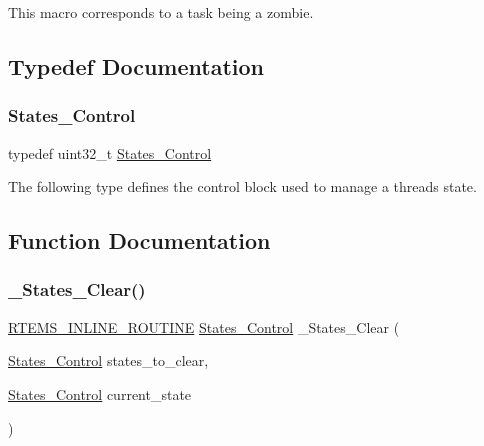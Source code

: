 This macro corresponds to a task being a zombie. 

\subsection{Typedef Documentation}
\mbox{\label{group__RTEMSScoreStates_gaeebbea0bfca162709b124fd519cf99d3}} 
\subsubsection{\texorpdfstring{States\_Control}{States\_Control}}
{\footnotesize\ttfamily typedef uint32\+\_\+t \mbox{\hyperlink{group__RTEMSScoreStates_gaeebbea0bfca162709b124fd519cf99d3}{States\+\_\+\+Control}}}

The following type defines the control block used to manage a thread\textquotesingle{}s state. 

\subsection{Function Documentation}
\mbox{\label{group__RTEMSScoreStates_gabe395b719ed97f651f8df63a1cc20149}} 
\subsubsection{\texorpdfstring{\_States\_Clear()}{\_States\_Clear()}}
{\footnotesize\ttfamily \mbox{\hyperlink{group__RTEMSScoreBaseDefs_gac216239df231d5dbd15e3520b0b9313f}{R\+T\+E\+M\+S\+\_\+\+I\+N\+L\+I\+N\+E\+\_\+\+R\+O\+U\+T\+I\+NE}} \mbox{\hyperlink{group__RTEMSScoreStates_gaeebbea0bfca162709b124fd519cf99d3}{States\+\_\+\+Control}} \+\_\+\+States\+\_\+\+Clear (\begin{DoxyParamCaption}\item[{\mbox{\hyperlink{group__RTEMSScoreStates_gaeebbea0bfca162709b124fd519cf99d3}{States\+\_\+\+Control}}}]{states\+\_\+to\+\_\+clear,  }\item[{\mbox{\hyperlink{group__RTEMSScoreStates_gaeebbea0bfca162709b124fd519cf99d3}{States\+\_\+\+Control}}}]{current\+\_\+state }\end{DoxyParamCaption})}



